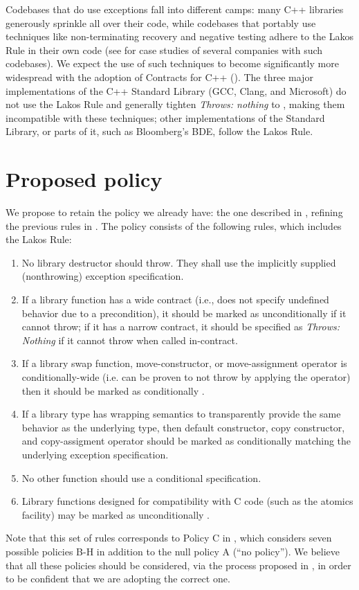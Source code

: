 Codebases that do use exceptions fall into different camps: many C++ libraries generously sprinkle  all over their code, while codebases that portably use techniques like non-terminating recovery and negative testing adhere to the Lakos Rule in their own code (see \cite{P2831R0} for case studies of several companies with such codebases). We expect the use of such techniques to become significantly more widespread with the adoption of Contracts for C++ (\cite{P2900R5}). The three major implementations of the C++ Standard Library (GCC, Clang, and Microsoft) do not use the Lakos Rule and generally tighten \emph{Throws: nothing} to , making them incompatible with these techniques; other implementations of the Standard Library, or parts of it, such as Bloomberg's BDE, follow the Lakos Rule.


\section{Proposed policy}
\label{sec:policy}

We propose to retain the policy we already have: the one described in \cite{P0884R0}, refining the previous rules in \cite{N3279}. The policy consists of the following rules, which includes the Lakos Rule:
\begin{enumerate}[label=\alph*)]
\item No library destructor should throw. They shall use the implicitly supplied (nonthrowing)
exception specification.
\item If a library function has a wide contract (i.e., does not specify undefined behavior due to a precondition), it should be marked as unconditionally  if it cannot throw; if it has a narrow contract, it should be specified as \emph{Throws: Nothing} if it cannot throw when called in-contract.
\item If a library swap function, move-constructor, or move-assignment operator is
conditionally-wide (i.e. can be proven to not throw by applying the  operator)
then it should be marked as conditionally .
\item If a library type has wrapping semantics to transparently provide the same behavior as
the underlying type, then default constructor, copy constructor, and copy-assigment
operator should be marked as conditionally  matching the underlying exception
specification.
\item No other function should use a conditional  specification.
\item Library functions designed for compatibility with C code (such as the atomics facility)
may be marked as unconditionally . 
\end{enumerate}
Note that this set of rules corresponds to Policy C in \cite{P3005R0}, which considers seven possible  policies B-H in addition to the null policy A (``no policy''). We believe that all these policies should be considered, via the process proposed in \cite{P3005R0}, in order to be confident that we are adopting the correct one.

